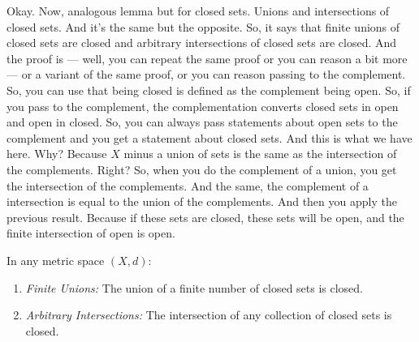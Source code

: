 \begin{spoken-clean}[00:21:15 - 00:24:04]
Okay. Now, analogous lemma but for closed sets.  Unions and intersections of closed sets. And it's the same but the opposite. So, it says that finite unions of closed sets are closed and arbitrary intersections of closed sets are closed. And the proof is --- well, you can repeat the same proof or you can reason a bit more --- or a variant of the same proof, or you can reason passing to the complement. So, you can use that being closed is defined as the complement being open. So, if you pass to the complement, the complementation converts closed sets in open and open in closed. So, you can always pass statements about open sets to the complement and you get a statement about closed sets. And this is what we have here. Why? Because $X$ minus a union of sets is the same as the intersection of the complements. Right? So, when you do the complement of a union, you get the intersection of the complements. And the same, the complement of a intersection is equal to the union of the complements. And then you apply the previous result. Because if these sets are closed, these sets will be open, and the finite intersection of open is open.
\end{spoken-clean}

\begin{nice-box}
\setcounter{theorem}{43}
\begin{proposition}\label{prop:closed-sets-properties}
In any metric space $(X, d)$:
\begin{enumerate}
    \setcounter{enumi}{0} \item \emph{Finite Unions:} The union of a finite number of closed sets is closed.
    \setcounter{enumi}{1} \item \emph{Arbitrary Intersections:} The intersection of any collection of closed sets is closed.
\end{enumerate}
\end{proposition}
\end{nice-box}


